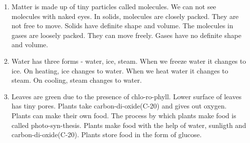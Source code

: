 
\begin{enumerate}

    \item Matter is made up of tiny particles called molecules. We can not see molecules with naked eyes.
    In solids, molecules are closely packed. They are not free to move. Solids have definite shape and volume.
    The molecules in gases are loosely packed. They can move freely. Gases have no definite shape and volume.

    \item Water has three forms - water, ice, steam. When we freeze water it changes to ice. On heating, ice changes to water.
    When we heat water it changes to steam. On cooling, steam changes to water.

    \item Leaves are green due to the presence of chlo-ro-phyll. Lower surface of leaves has tiny pores.
    Plants take carbon-di-oxide(C-20) and gives out oxygen. Plants can make their own food. The process by which plants make food is
    called photo-syn-thesis. Plants make food with the help of water, sunligth and carbon-di-oxide(C-20). Plants store food in the form of
    glucose.

\end{enumerate}

